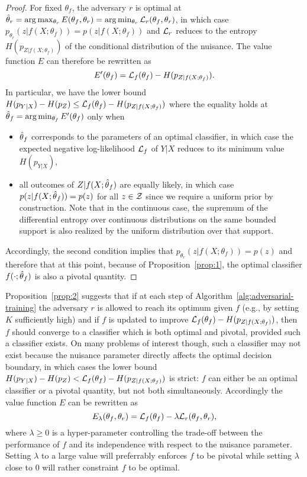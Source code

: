 \documentclass{article}
\theoremstyle{plain}
\begin{document}
\begin{proof}
For fixed $\theta_f$, the adversary $r$ is optimal at $\hat\theta_r = \arg
\max_{\theta_r} E(\theta_f, \theta_r)  = \arg \min_{\theta_r} {\cal L}_r(\theta_f,
\theta_r)$, in which case $p_{\theta_r}(z|f(X;\theta_f)) = p(z|f(X;\theta_f))$ and ${\cal L}_r$ reduces to the entropy
$H(p_{Z|f(X;\theta_f)})$ of the conditional distribution of the nuisance. The
value function $E$ can therefore be rewritten as $$E'(\theta_f) = {\cal L}_f(\theta_f) -
H(p_{Z|f(X;\theta_f)}).$$  In particular, we have the lower bound $H(p_{Y|X}) -
H(p_Z) \leq {\cal L}_f(\theta_f) - H(p_{Z|f(X;\theta_f)})$ where the equality
holds at $\smash{\hat\theta}_f = \arg \min_{\theta_f} E'(\theta_f)$ only when
\begin{itemize}
    \item $\smash{\hat\theta}_f$ corresponds to
    the parameters of an optimal classifier, in which case the expected negative log-likelihood ${\cal L}_f$ of $Y|X$
    reduces to its minimum value $H(p_{Y|X})$,
    \item all
   outcomes of $Z|f(X;\smash{\hat\theta}_f)$ are equally likely, in which case
   $p(z|f(X;\smash{\hat\theta}_f)) = p(z)$ for all $z \in {\cal
   Z}$ since we require a uniform prior by construction. Note that in the continuous case, the supremum of the differential entropy
   over continuous distributions on the same bounded support is also realized by the uniform distribution over that support.
\end{itemize}
Accordingly, the second condition implies that $p_{\theta_r}(z|f(X;\theta_f)) = p(z)$ and therefore that at this
point, because of Proposition~\ref{prop:1}, the optimal classifier $f(\cdot;\smash{\hat\theta}_f)$ is also a pivotal quantity.
\end{proof}

Proposition~\ref{prop:2} suggests that if at each step of
Algorithm~\ref{alg:adversarial-training} the adversary $r$ is allowed to reach
its optimum given $f$ (e.g., by setting $K$ sufficiently high) and if $f$ is
updated to improve ${\cal L}_f(\theta_f) - H(p_{Z|f(X;\theta_f)})$, then $f$
should converge to a classifier which is both optimal and pivotal, provided such
a classifier exists. On many problems of interest though, such a classifier may
not exist because the nuisance parameter directly affects the optimal decision
boundary, in which cases the lower bound $H(p_{Y|X}) - H(p_Z) < {\cal
L}_f(\theta_f) - H(p_{Z|f(X;\theta_f)})$ is strict: $f$ can either be an optimal
classifier or a pivotal quantity, but not both simultaneously. Accordingly the
value function $E$ can be rewritten as
\begin{equation}
    E_\lambda(\theta_f, \theta_r) = {\cal L}_f(\theta_f) - \lambda {\cal L}_r(\theta_f, \theta_r),
\end{equation}
where $\lambda \geq 0$ is a hyper-parameter controlling the trade-off between the performance of $f$
and its independence with respect to the nuisance parameter. Setting $\lambda$ to a large
value will preferrably enforces $f$ to be pivotal while setting $\lambda$ close to $0$
will rather constraint $f$ to be optimal.
\end{document}
